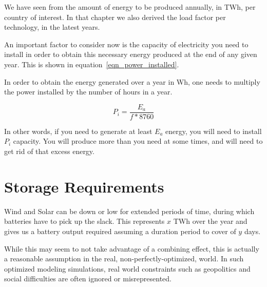 We have seen from  the amount of energy to be produced annually, in TWh, per country of interest. In that chapter we also derived the load factor per technology, in the latest years.


An important factor to consider now is the capacity of electricity you need to install in order to obtain this necessary energy produced at the end of any given year. This is shown in equation~\ref{eqn_power_installed}.

\begin{remark}
In order to obtain the energy generated over a year in Wh, one needs to multiply the power installed by the number of hours in a year.

\begin{equation}\label{eqn_power_installed}
P_i = \frac{E_a}{f * 8760}
\end{equation}

\end{remark}

In other words, if you need to generate at least $E_a$ energy, you will need to install $P_i$ capacity. You will produce more than you need at some times, and will need to get rid of that excess energy.

\section{Storage Requirements}



\begin{kaobox}[frametitle=What we have said]
Wind and Solar can be down or low for extended periods of time, during which batteries have to pick up the slack. This represents $x$ TWh over the year and gives us a battery output required assuming a duration period to cover of $y$ days.

While this may seem to not take advantage of a combining effect, this is actually a reasonable assumption in the real, non-perfectly-optimized, world. In such optimized modeling simulations, real world constraints such as geopolitics and social difficulties are often ignored or misrepresented.

\end{kaobox}







